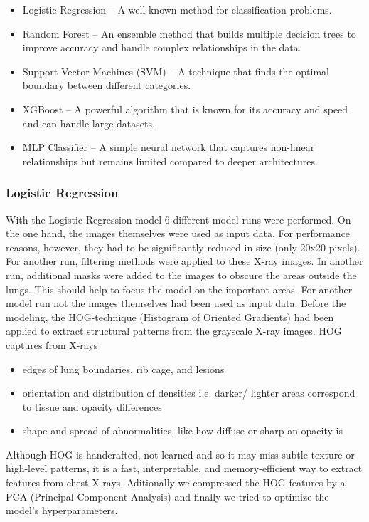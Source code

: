 \documentclass{article}
\begin{document}
\begin{itemize}
    \item Logistic Regression – A well-known method for classification problems.
    \item Random Forest – An ensemble method that builds multiple decision trees to improve accuracy and handle complex relationships in the data.
    \item Support Vector Machines (SVM) – A technique that finds the optimal boundary between different categories.
    \item XGBoost – A powerful algorithm that is known for its accuracy and speed and can handle large datasets.
    \item MLP Classifier – A simple neural network that captures non-linear relationships but remains limited compared to deeper architectures.
\end{itemize}


\subsubsection{Logistic Regression}
With the Logistic Regression model 6 different model runs were performed. On the one hand, the images themselves were used as input data. For performance reasons, however, they had to be significantly reduced in size (only 20x20 pixels). For another run, filtering methods were applied to these X-ray images. In another run, additional masks were added to the images to obscure the areas outside the lungs. This should help to focus the model on the important areas. 
For another model run not the images themselves had been used as input data. Before the modeling, the HOG-technique (Histogram of Oriented Gradients) had been applied to extract structural patterns from the grayscale X-ray images. HOG captures from X-rays
\begin{itemize}
     \item edges of lung boundaries, rib cage, and lesions
     \item orientation and distribution of densities i.e. darker/ lighter areas correspond to tissue and opacity differences
     \item shape and spread of abnormalities, like how diffuse or sharp an opacity is
\end{itemize}
Although HOG is handcrafted, not learned  and  so it may miss subtle texture or high-level patterns, it is a fast, interpretable, and memory-efficient way to extract features from chest X-rays. 
Aditionally we compressed the HOG features by a PCA (Principal Component Analysis) and finally we tried to optimize the model's hyperparameters. 
\end{document}
